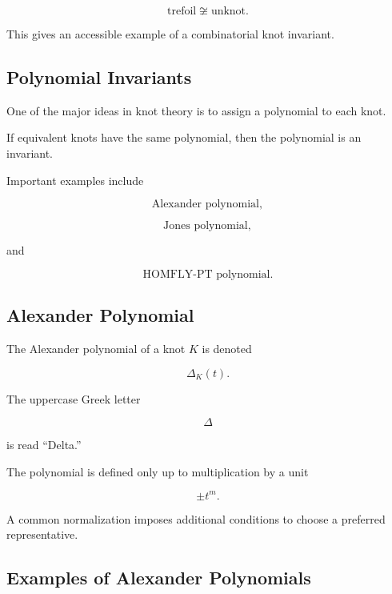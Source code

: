 \[
\boxed{
\text{trefoil}\not\cong\text{unknot}.
}
\]

This gives an accessible example of a combinatorial knot invariant.

\subsection{Polynomial Invariants}
\label{subsec:polynomial-knot-invariants}

One of the major ideas in knot theory is to assign a polynomial to each knot.

If equivalent knots have the same polynomial, then the polynomial is an
invariant.

Important examples include

\[
\boxed{
\text{Alexander polynomial},
}
\]

\[
\boxed{
\text{Jones polynomial},
}
\]

and

\[
\boxed{
\text{HOMFLY-PT polynomial}.
}
\]

\subsection{Alexander Polynomial}
\label{subsec:alexander-polynomial}

The Alexander polynomial of a knot \(K\) is denoted

\[
\boxed{
\Delta_K(t).
}
\]

The uppercase Greek letter

\[
\Delta
\]

is read ``Delta.''

The polynomial is defined only up to multiplication by a unit

\[
\boxed{
\pm t^m.
}
\]

A common normalization imposes additional conditions to choose a preferred
representative.

\subsection{Examples of Alexander Polynomials}
\label{subsec:alexander-polynomial-examples}

